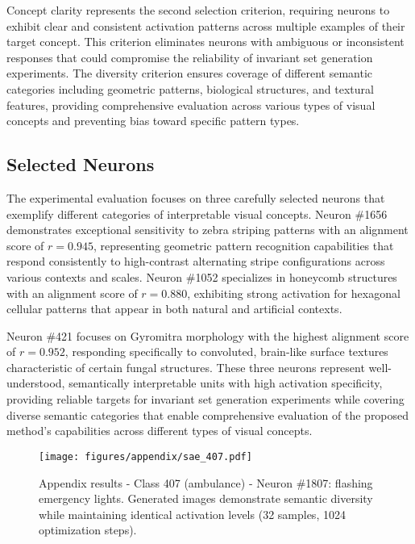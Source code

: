 Concept clarity represents the second selection criterion, requiring neurons to exhibit clear and consistent activation patterns across multiple examples of their target concept. This criterion eliminates neurons with ambiguous or inconsistent responses that could compromise the reliability of invariant set generation experiments. The diversity criterion ensures coverage of different semantic categories including geometric patterns, biological structures, and textural features, providing comprehensive evaluation across various types of visual concepts and preventing bias toward specific pattern types.

\subsection{Selected Neurons}

The experimental evaluation focuses on three carefully selected neurons that exemplify different categories of interpretable visual concepts. Neuron \#1656 demonstrates exceptional sensitivity to zebra striping patterns with an alignment score of $r = 0.945$, representing geometric pattern recognition capabilities that respond consistently to high-contrast alternating stripe configurations across various contexts and scales. Neuron \#1052 specializes in honeycomb structures with an alignment score of $r = 0.880$, exhibiting strong activation for hexagonal cellular patterns that appear in both natural and artificial contexts.

Neuron \#421 focuses on Gyromitra morphology with the highest alignment score of $r = 0.952$, responding specifically to convoluted, brain-like surface textures characteristic of certain fungal structures. These three neurons represent well-understood, semantically interpretable units with high activation specificity, providing reliable targets for invariant set generation experiments while covering diverse semantic categories that enable comprehensive evaluation of the proposed method's capabilities across different types of visual concepts.


\begin{figure}[p]
  \centering
  \texttt{[image: figures/appendix/sae\_407.pdf]}
  \caption{Appendix results - Class 407 (ambulance) - Neuron \#1807: flashing emergency lights. Generated images demonstrate semantic diversity while maintaining identical activation levels (32 samples, 1024 optimization steps).}
  \label{fig:appendix_407}
\end{figure}

